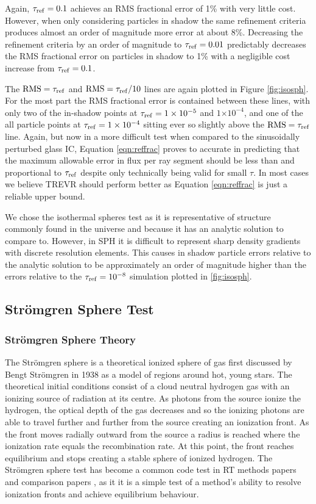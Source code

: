 \documentclass[fleq,usenatbib]{mnras}
\newcommand{\acro}{TREVR}
\providecommand{\e}[1]{\ensuremath{\times10^{#1}}}
\newcommand{\tr}{\tau_{\rm ref}}
\newcommand{\strom}{Str\"omgren}
\begin{document}
Again, $\tr=0.1$ achieves an RMS fractional error of 1\% with very 
little cost. However, when only considering particles in shadow the same 
refinement criteria produces almost an order of magnitude more error at about 
8\%. Decreasing the refinement criteria by an order of magnitude to 
$\tr=0.01$ predictably decreases the RMS fractional error on particles in 
shadow to 1\% with a negligible cost increase from $\tr=0.1$. 

The $\rm{RMS}=\tr$ and $\rm{RMS}=\tr/10$ lines are again plotted in Figure 
\ref{fig:isosph}. For the most part the RMS fractional error is contained 
between these lines, with only two of the in-shadow points at $\tr=1\e{-5}$ 
and $1\e{-4}$,  and one of the all particle points at  $\tr=1\e{-4}$ sitting 
ever so slightly above the $\rm{RMS}=\tr$ line. Again, but now in a more 
difficult test when compared to the sinusoidally perturbed glass IC, Equation 
\ref{eqn:reffrac} proves to accurate in predicting that the maximum allowable 
error in flux per ray segment should be less than and proportional to $\tr$
despite only technically being valid for small $\tau$. In most cases we 
believe \acro{} should perform better as Equation \ref{eqn:reffrac} is just a 
reliable upper bound.

We chose the isothermal spheres test as it is representative of structure
commonly found in the universe and because it has an analytic solution to 
compare to. However, in SPH it is difficult to represent sharp density 
gradients with discrete resolution elements. This causes in shadow particle 
errors relative to the analytic solution to be approximately an order of 
magnitude higher than the errors relative to the $\tr = 10^{-8}$ simulation
plotted in \ref{fig:isosph}.

\subsection{\strom{} Sphere Test}
\subsubsection{\strom{} Sphere Theory}
The \strom{} sphere is a theoretical ionized sphere of gas first discussed by 
Bengt \strom{} in 1938 \citep{stromgren39} as a model of regions around hot, 
young stars. The theoretical initial conditions consist of a cloud neutral 
hydrogen gas with an ionizing source of radiation at its centre. As photons 
from the source ionize the hydrogen, the optical depth of the gas decreases 
and so the ionizing photons are able to travel further and further from the 
source creating an ionization front. As the front moves radially outward from 
the source a radius is reached where the ionization rate equals the 
recombination rate. At this point, the front reaches equilibrium and stops 
creating a stable sphere of ionized hydrogen. The \strom{} sphere test has 
become a common code test in RT methods papers \citep{pawlikSchaye08,
pawlikSchaye11, petkovaSpringel11} and comparison papers \citep{ilievEt06, 
ilievEt09}, as it it is a simple test of a method's ability to resolve 
ionization fronts and achieve equilibrium behaviour.
\end{document}
